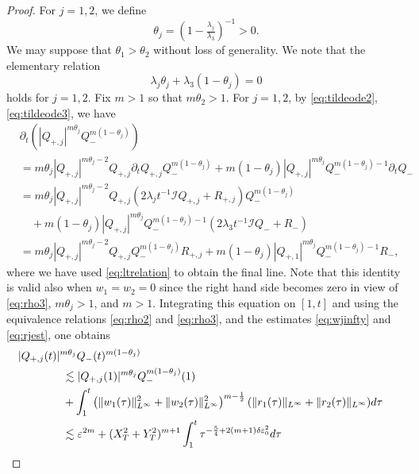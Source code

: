 \documentclass[11pt,a4paper,twosides]{amsart}
\theoremstyle{plain}
\theoremstyle{remark}
\numberwithin{equation}{section}
\def\({\left(}
\def\){\right)}
\newcommand{\eps}{\varepsilon}
\newcommand{\pt}{\partial}
\theoremstyle{definition}
\newcommand{\1}{{\bf 1}_{\{|x| < |t|\}}}
\renewcommand{\epsilon}{\varepsilon}
\begin{document}
\begin{proof}
For $j=1,2$,
we define
\[
	\theta_j = (1-\tfrac{\lambda_j}{\lambda_3})^{-1} >0.
\]
We may suppose that $\theta_1>\theta_2$ without loss of generality.
We note that the elementary relation
\begin{equation}\label{eq:ltrelation}
	\lambda_j \theta_j + \lambda_3 (1-\theta_j) = 0
\end{equation}
holds for $j=1,2$.
Fix $m >1$ so that $m\theta_2>1$.
For $j=1,2$, by \eqref{eq:tildeode2}, \eqref{eq:tildeode3}, 
we have
  \begin{align*}
     & \pt_t(|Q_{+,j}|^{m\theta_j}Q_-^{m (1-\theta_j)})\\
    &= m\theta_j|Q_{+,j}|^{m\theta_j-2}
    Q_{+,j}\pt_tQ_{+,j}Q_-^{m(1- \theta_j)}
    + m(1-\theta_j)|Q_{+,j}|^{m\theta_j}
    Q_-^{m(1-\theta_j)-1}\pt_tQ_-\\
    &= m\theta_j|Q_{+,j}|^{m\theta_j-2}
    Q_{+,j}(2\lambda_j t^{-1}\mathcal{I}Q_{+,j} + R_{+,j})Q_-^{m(1-\theta_j)} \\
    &\quad
    + m(1-\theta_j) |Q_{+,j}|^{m\theta_j} Q_-^{m(1-\theta_j)-1}(2\lambda_3t^{-1}\mathcal{I}Q_- + R_-)\\
	&=  m\theta_j|Q_{+,j}|^{m\theta_j-2}
    Q_{+,j}Q_-^{m(1-\theta_j)}R_{+,j} + m(1-\theta_j) |Q_{+,1}|^{m\theta_j} Q_-^{m(1-\theta_j)-1} R_-,
  \end{align*}
  where we have used \eqref{eq:ltrelation} to obtain the final line.
 Note that this identity is valid also when $w_1=w_2=0$ since the right hand side becomes zero in view of \eqref{eq:rho3},
 $m\theta_j>1$, and $m>1$.
  Integrating this equation on $[1,t]$ and using the equivalence relations \eqref{eq:rho2} and \eqref{eq:rho3}, and 
the estimates \eqref{eq:wjinfty} and \eqref{eq:rjest}, one obtains
\begin{equation}\label{eq:rhopjest}
\begin{aligned}
\lefteqn{|Q_{+,j}(t)|^{m\theta_j}Q_-(t)^{m (1-\theta_j)}}\qquad\qquad\\
	&\lesssim {}|Q_{+,j}(1)|^{m\theta_j}Q_-^{m(1- \theta_j)}(1)\\
	&+ \int_1^t \(\|w_1(\tau)\|_{L^\infty}^2+\|w_2(\tau)\|_{L^\infty}^2\)^{m-\frac12} (\| r_{1}(\tau)\|_{L^\infty}+\| r_2(\tau)\|_{L^\infty})
    d\tau                                                \\
     &\lesssim \eps^{2m}  +  (X_T^2+Y_T^2)^{m+1}   \int_1^t\tau^{-\frac{5}{4}+2(m+1)\delta\epsilon_0^2}d\tau                                                 \\

\end{aligned}
\end{equation}
\end{proof}
\end{document}
